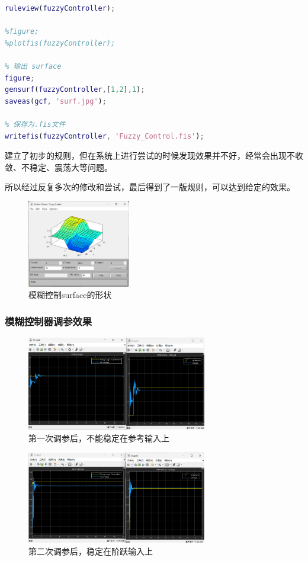 \documentclass[12pt,a4paper,UTF8]{article}
\begin{document}
\begin{lstlisting}[language=Matlab,caption=可视化规则]
% 可视化规则
ruleview(fuzzyController);

%figure;
%plotfis(fuzzyController);

% 输出 surface
figure;
gensurf(fuzzyController,[1,2],1);
saveas(gcf, 'surf.jpg');

% 保存为.fis文件
writefis(fuzzyController, 'Fuzzy_Control.fis');
\end{lstlisting}

建立了初步的规则，但在系统上进行尝试的时候发现效果并不好，经常会出现不收敛、不稳定、震荡大等问题。

所以经过反复多次的修改和尝试，最后得到了一版规则，可以达到给定的效果。


\begin{figure}[htbp] \centering \includegraphics[width=0.4\textwidth]{2025-01-10-16-18-48.png} \caption{模糊控制surface的形状}\end{figure}

\subsubsection{模糊控制器调参效果}

\begin{figure}[htbp] \centering \includegraphics[width=0.7\textwidth]{2025-01-10-13-42-51.png} \caption{第一次调参后，不能稳定在参考输入上}\end{figure}

\begin{figure}[htbp] \centering \includegraphics[width=0.7\textwidth]{2025-01-10-13-45-18.png} \caption{第二次调参后，稳定在阶跃输入上}\end{figure}
\end{document}

